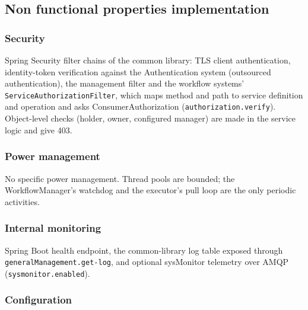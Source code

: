 \documentclass[a4paper]{arrowhead}
\begin{document}
\subsection{Non functional properties implementation}
\subsubsection{Security}
Spring Security filter chains of the common library: TLS client authentication, identity-token verification against
the Authentication system (outsourced authentication), the management filter and the workflow systems'
\texttt{Service\allowbreak{}Authorization\allowbreak{}Filter}, which maps method and path to service definition and operation and asks
ConsumerAuthorization (\texttt{authorization.\allowbreak{}verify}). Object-level checks (holder, owner, configured manager) are made in
the service logic and give 403.
\subsubsection{Power management}
No specific power management. Thread pools are bounded; the WorkflowManager's watchdog and the executor's pull loop are
the only periodic activities.
\subsubsection{Internal monitoring}
Spring Boot health endpoint,
the common-library log table exposed through \texttt{general\allowbreak{}Management.\allowbreak{}get-\allowbreak{}log}, and optional sysMonitor telemetry over
AMQP (\texttt{sysmonitor.\allowbreak{}enabled}).
\subsubsection{Configuration}
\end{document}

